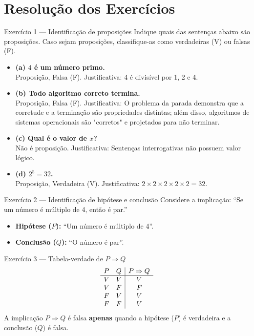 \documentclass[12pt]{article}
\begin{document}
\vspace*{0.2cm}
\section*{Resolução dos Exercícios}

\begin{block}{Exercício 1 — Identificação de proposições}
Indique quais das sentenças abaixo são proposições. Caso sejam proposições, classifique-as como verdadeiras (V) ou falsas (F).
\begin{itemize}
    \item \textbf{(a) $4$ é um número primo.} \\ Proposição, Falsa (F). Justificativa: 4 é divisível por 1, 2 e 4.
    \item \textbf{(b) Todo algoritmo correto termina.} \\ Proposição, Falsa (F). Justificativa: O problema da parada demonstra que a corretude e a terminação são propriedades distintas; além disso, algoritmos de sistemas operacionais são "corretos" e projetados para não terminar.
    \item \textbf{(c) Qual é o valor de $x$?} \\ Não é proposição. Justificativa: Sentenças interrogativas não possuem valor lógico.
    \item \textbf{(d) $2^5 = 32$.} \\ Proposição, Verdadeira (V). Justificativa: $2 \times 2 \times 2 \times 2 \times 2 = 32$.
\end{itemize}
\end{block}

\begin{block}{Exercício 2 — Identificação de hipótese e conclusão}
Considere a implicação: ``Se um número é múltiplo de 4, então é par.''
\begin{itemize}
    \item \textbf{Hipótese ($P$):} ``Um número é múltiplo de 4''.
    \item \textbf{Conclusão ($Q$):} ``O número é par''.
\end{itemize}
\end{block}

\begin{block}{Exercício 3 — Tabela-verdade de $P \Rightarrow Q$}
\[
\begin{array}{c c | c}
P & Q & P \Rightarrow Q \\
\hline
V & V & V \\
V & F & F \\
F & V & V \\
F & F & V
\end{array}
\]
A implicação $P \Rightarrow Q$ é falsa \textbf{apenas} quando a hipótese ($P$) é verdadeira e a conclusão ($Q$) é falsa.
\end{block}
\end{document}
